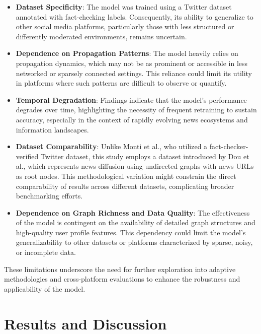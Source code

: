 \documentclass[sigconf,nonacm]{acmart}
\begin{document}
\begin{itemize}
    \item \textbf{Dataset Specificity}: The model was trained using a Twitter dataset annotated with fact-checking labels. Consequently, its ability to generalize to other social media platforms, particularly those with less structured or differently moderated environments, remains uncertain.

    \item \textbf{Dependence on Propagation Patterns}: The model heavily relies on propagation dynamics, which may not be as prominent or accessible in less networked or sparsely connected settings. This reliance could limit its utility in platforms where such patterns are difficult to observe or quantify.

    \item \textbf{Temporal Degradation}: Findings indicate that the model's performance degrades over time, highlighting the necessity of frequent retraining to sustain accuracy, especially in the context of rapidly evolving news ecosystems and information landscapes.

    \item \textbf{Dataset Comparability}: Unlike Monti et al., who utilized a fact-checker-verified Twitter dataset, this study employs a dataset introduced by Dou et al., which represents news diffusion using undirected graphs with news URLs as root nodes. This methodological variation might constrain the direct comparability of results across different datasets, complicating broader benchmarking efforts.

    \item \textbf{Dependence on Graph Richness and Data Quality}: The effectiveness of the model is contingent on the availability of detailed graph structures and high-quality user profile features. This dependency could limit the model’s generalizability to other datasets or platforms characterized by sparse, noisy, or incomplete data.
\end{itemize}

These limitations underscore the need for further exploration into adaptive methodologies and cross-platform evaluations to enhance the robustness and applicability of the model.



\section{Results and Discussion}
\end{document}
